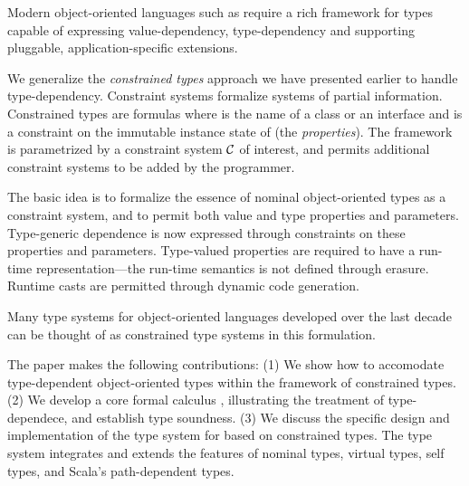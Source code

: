 Modern object-oriented languages such as \Xten{} require a rich framework for types
capable of expressing value-dependency, type-dependency and supporting
pluggable, application-specific extensions.

We generalize the {\em constrained types} approach we have presented
earlier to handle type-dependency.  Constraint systems formalize
systems of partial information.  Constrained types are formulas
 where  is the name of a class or an interface and
 is a constraint on the immutable instance state of 
 (the {\em properties}). The framework is parametrized by 
a constraint system $\cal C$ of interest, and permits additional
constraint systems to be added by the programmer.

The basic idea is to formalize the essence of nominal object-oriented
types as a constraint system, and to permit both value and type
properties and parameters.  Type-generic dependence is now expressed
through constraints on these properties and parameters.  Type-valued
properties are required to have a run-time representation---the
run-time semantics is not defined through erasure. Runtime casts are
permitted through dynamic code generation.

Many type systems for object-oriented languages developed over the
last decade can be thought of as constrained type systems in this
formulation.

The paper makes the following contributions: (1) We show how to
accomodate type-dependent object-oriented types within the framework
of constrained types. (2) We develop a core formal calculus \FX,
illustrating the treatment of type-dependece, and establish type
soundness.  (3) We discuss the specific design and implementation of
the type system for \Xten{} based on constrained types.  The type system
integrates and extends the features of nominal types, virtual types,
self types, and Scala's path-dependent types.
